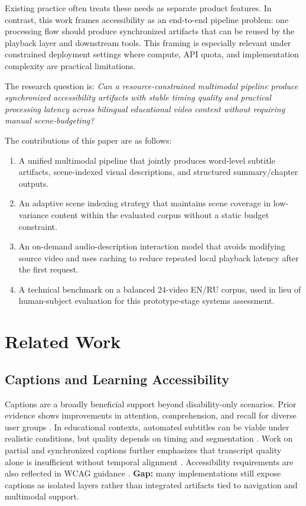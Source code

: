 \documentclass[conference]{IEEEtran}
\begin{document}
Existing practice often treats these needs as separate product features. In contrast, this work frames accessibility as an end-to-end pipeline problem: one processing flow should produce synchronized artifacts that can be reused by the playback layer and downstream tools. This framing is especially relevant under constrained deployment settings where compute, API quota, and implementation complexity are practical limitations.

The research question is: \emph{Can a resource-constrained multimodal pipeline produce synchronized accessibility artifacts with stable timing quality and practical processing latency across bilingual educational video content without requiring manual scene-budgeting?}

The contributions of this paper are as follows:
\begin{enumerate}
\item A unified multimodal pipeline that jointly produces word-level subtitle artifacts, scene-indexed visual descriptions, and structured summary/chapter outputs.
\item An adaptive scene indexing strategy that maintains scene coverage in low-variance content within the evaluated corpus without a static budget constraint.
\item An on-demand audio-description interaction model that avoids modifying source video and uses caching to reduce repeated local playback latency after the first request.
\item A technical benchmark on a balanced 24-video EN/RU corpus, used in lieu of human-subject evaluation for this prototype-stage systems assessment.
\end{enumerate}

\section{Related Work}
\subsection{Captions and Learning Accessibility}
Captions are a broadly beneficial support beyond disability-only scenarios. Prior evidence shows improvements in attention, comprehension, and recall for diverse user groups \cite{Gernsbacher2015}. In educational contexts, automated subtitles can be viable under realistic conditions, but quality depends on timing and segmentation \cite{Malakul2023}. Work on partial and synchronized captions further emphasizes that transcript quality alone is insufficient without temporal alignment \cite{Mirzaei2018}. Accessibility requirements are also reflected in WCAG guidance \cite{WCAG21}. \textbf{Gap:} many implementations still expose captions as isolated layers rather than integrated artifacts tied to navigation and multimodal support.
\end{document}
